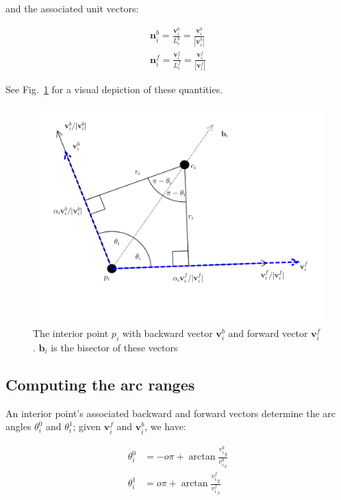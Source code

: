 \documentclass{article}
\begin{document}
and the associated unit vectors:

\begin{equation}
  \label{eq:unit-vectors}
  \begin{split}
    \mathbf{n}^{b}_{i} = \frac{\mathbf{v}^{b}_{i}}{L^{b}_{i}} =\frac{\mathbf{v}^{b}_{i}}{|\mathbf{v}^{b}_{i}|}\\
    \mathbf{n}^{f}_{i} = \frac{\mathbf{v}^{f}_{i}}{L^{f}_{i}} =\frac{\mathbf{v}^{f}_{i}}{|\mathbf{v}^{f}_{i}|}
  \end{split}
\end{equation}

See Fig.~\ref{fig:interior-point} for a visual depiction of these quantities.

\begin{figure}[h]
  \centering
  \includegraphics[width=\columnwidth]{4}
  \caption{The interior point $p_{i}$ with backward vector $\mathbf{v}^{b}_{i}$ and forward vector $\mathbf{v}^{f}_{i}$. $\mathbf{b}_{i}$ is the bisector of these vectors}
  \label{fig:interior-point}
\end{figure}

\subsection{Computing the arc ranges}

An interior point's associated backward and forward vectors determine the arc angles $\theta^0_i$ and $\theta^{1}_{i}$; given $\mathbf{v}^{f}_{i}$ and $\mathbf{v}^{b}_{i}$, we have:

\begin{align}
  \theta^{0}_{i} &= -o\pi + \arctan \frac{{v^{b}_{i}}_{y}}{{v^{b}_{i}}_{x}}\\
  \theta^{1}_{i} &=  o\pi + \arctan \frac{{v^{f}_{i}}_{y}}{{v^{f}_{i}}_{x}}
\end{align}
\end{document}
